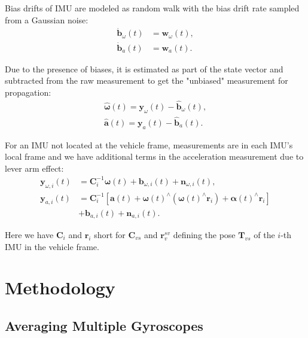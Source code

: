 \documentclass[conference]{IEEEtran}
\begin{document}
Bias drifts of IMU are modeled as random walk with the bias drift rate sampled from a Gaussian noise:
\begin{equation}
\begin{split}
    \dot{\textbf{b}}_\omega(t) &= \textbf{w}_\omega(t), \\
    \dot{\textbf{b}}_a(t) &= \textbf{w}_a(t).
\end{split}
\end{equation}

\noindent Due to the presence of biases, it is estimated as part of the state vector and subtracted from the raw measurement to get the "unbiased" measurement for propagation:
\begin{equation}
\begin{split}
    \hat{\bm{\omega}}(t) = \textbf{y}_\omega(t) - \hat{\textbf{b}}_\omega(t), \\
    \hat{\textbf{a}}(t)  = \textbf{y}_a(t) - \hat{\textbf{b}}_a(t).
\end{split}
\end{equation}

For an IMU not located at the vehicle frame, measurements are in each IMU's local frame and we have additional terms in the acceleration measurement due to lever arm effect:
\begin{equation}
\begin{split}
    \textbf{y}_{\omega,i}(t) &= \textbf{C}_{i}^{-1} \bm{\omega}(t) + \textbf{b}_{\omega, i}(t) + \textbf{n}_{\omega,i}(t), \\
    \textbf{y}_{a,i}(t) &= \textbf{C}_i^{-1} \left[ \textbf{a}(t) + \bm{\omega}(t)^\wedge (\bm{\omega}(t)^\wedge \textbf{r}_i) + \bm{\alpha}(t)^\wedge \textbf{r}_i \right] \\
    &+ \textbf{b}_{a,i}(t) + \textbf{n}_{a,i}(t).
\end{split}
\end{equation}

\noindent Here we have $\textbf{C}_i$ and $\textbf{r}_i$ short for $\textbf{C}_{vs}$ and $\textbf{r}_v^{sv}$ defining the pose $\textbf{T}_{vs}$ of the $i$-th IMU in the vehicle frame.

\section{Methodology}\label{methodology}

\subsection{Averaging Multiple Gyroscopes}
\end{document}
